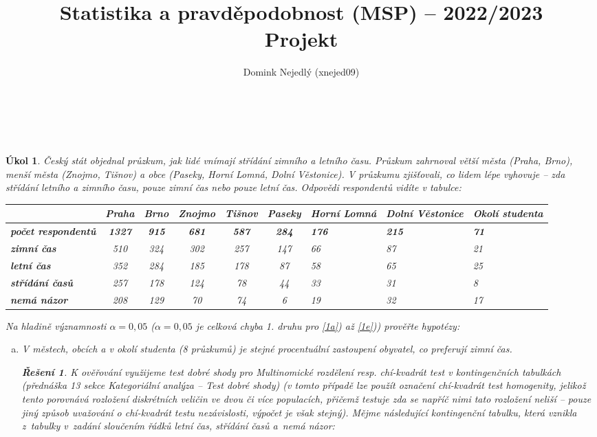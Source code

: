 \documentclass[11pt, a4paper]{article}
\title{Statistika a pravděpodobnost (MSP) – 2022/2023\\[1ex] Projekt}
\author{Domink Nejedlý (xnejed09)}
\makeatletter
\theoremstyle{result}
\newtheorem*{result}{Řešení}
\newtheorem{task}{Úkol}
\renewcommand\maketitle{
{\raggedright %
\begin{center}
{\Large \bfseries \@title }\\[2ex]
{\@author}\\[8ex] 
\end{center}}} %
\makeatother
\begin{document}
\maketitle

\begin{task}
    Český stát objednal průzkum, jak lidé vnímají střídání zimního a letního času. Průzkum zahrnoval větší města (Praha, Brno), menší města (Znojmo, Tišnov) a obce (Paseky, Horní Lomná, Dolní Věstonice). V průzkumu zjišťovali, co lidem lépe vyhovuje – zda střídání letního a zimního času, pouze zimní čas nebo pouze letní čas. Odpovědi respondentů vidíte v tabulce:
    
    \begin{center}
        \begin{tabular}{ |l|c|c|c|c|c|M{1.5cm}|M{1.9cm}|M{1.8cm}| }
            \hline
            & \textbf{Praha} & \textbf{Brno} & \textbf{Znojmo} & \textbf{Tišnov} & \textbf{Paseky} & \textbf{Horní Lomná} & \textbf{Dolní Věstonice} & \textbf{Okolí studenta} \\
            \hline
            \textbf{počet respondentů} & \textbf{1327} & \textbf{915} & \textbf{681} & \textbf{587} & \textbf{284} & \textbf{176} & \textbf{215} & \textbf{71} \\
            \hline
            \textbf{zimní čas} & 510 & 324 & 302 & 257 & 147 & 66 & 87 & 21 \\
            \hline
            \textbf{letní čas} & 352 & 284 & 185 & 178 & 87 & 58 & 65 & 25 \\
            \hline
            \textbf{střídání časů} & 257 & 178 & 124 & 78 & 44 & 33 & 31 & 8 \\
            \hline
            \textbf{nemá názor} & 208 & 129 & 70 & 74 & 6 & 19 & 32 & 17 \\
            \hline
        \end{tabular}
    \end{center}
    Na hladině významnosti $\alpha = 0,05$ ($\alpha = 0,05$ je celková chyba 1. druhu pro \ref{1a}) až \ref{1e})) prověřte hypotézy:
    
    \begin{enumerate}[a)]
        \item V městech, obcích a v okolí studenta (8 průzkumů) je stejné procentuální zastoupení obyvatel, co preferují zimní čas. \label{1a}

        \begin{result}
            K ověřování využijeme test dobré shody pro Multinomické rozdělení resp. chí-kvadrát test v kontingenčních tabulkách (přednáška 13 sekce Kategoriální analýza -- Test dobré shody) (v tomto případě lze použít označení chí-kvadrát test homogenity, jelikož tento porovnává rozložení diskrétních veličin ve dvou či více populacích, přičemž testuje zda se napříč nimi tato rozložení neliší -- pouze jiný způsob uvažování o chí-kvadrát testu nezávislosti, výpočet je však stejný). Mějme následující kontingenční tabulku, která vznikla z~tabulky v~zadání sloučením řádků \textit{letní čas}, \textit{střídání časů} a~\textit{nemá názor}:


\end{result}
\end{enumerate}
\end{task}
\end{document}
